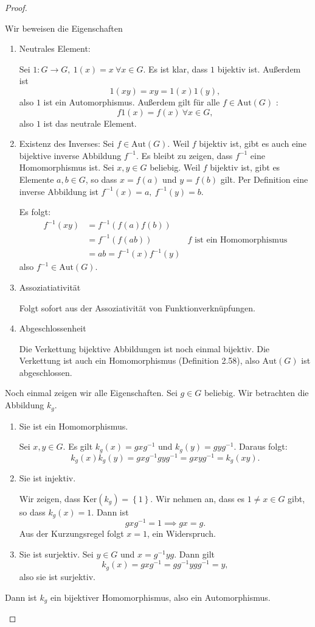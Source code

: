 \begin{proof}
	\begin{parts}
	\item Wir beweisen die Eigenschaften
		\begin{enumerate}[label=(\roman*)]
			\item Neutrales Element:

				Sei $1:G\to G,~1(x)=x~\forall x\in G$. Es ist klar, dass $1$ bijektiv ist. Außerdem ist
				\[
				1(xy)=xy=1(x)1(y)
			,\]
			also $1$ ist ein Automorphismus. Außerdem gilt f\"{u}r alle $f\in \text{Aut}(G)$ :
			 \[
			f 1(x)=f(x)~\forall x\in G
		,\]
		also $1$ ist das neutrale Element.
	\item Existenz des Inverses: Sei $f\in\text{Aut}(G)$. Weil $f$ bijektiv ist, gibt es auch eine bijektive inverse Abbildung $f^{-1}$. Es bleibt zu zeigen, dass $f^{-1}$ eine Homomorphismus ist. Sei $x,y\in G$ beliebig. Weil $f$ bijektiv ist, gibt es Elemente $a,b\in G$, so dass $x=f(a)$ und $y=f(b)$ gilt. Per Definition eine inverse Abbildung ist $f^{-1}(x)=a,~f^{-1}(y)=b$.

		Es folgt:
		\begin{align*}
			f^{-1}(xy)&=f^{-1}(f(a)f(b))\\
				  &=f^{-1}(f(ab)) & f\text{ ist ein Homomorphismus}\\
				  &=ab=f^{-1}(x)f^{-1}(y)
		\end{align*}
		also $f^{-1}\in \text{Aut}(G)$.
	\item Assoziatiativität

		Folgt sofort aus der Assoziativität von Funktionverknüpfungen.
	\item Abgeschlossenheit

		Die Verkettung bijektive Abbildungen ist noch einmal bijektiv. Die Verkettung ist auch ein Homomorphismus (Definition 2.58), also $\text{Aut}(G)$ ist abgeschlossen.
		\end{enumerate}
	\item Noch einmal zeigen wir alle Eigenschaften. Sei $g\in G$ beliebig. Wir betrachten die Abbildung $k_g$.
		\begin{enumerate}[label=(\roman*)]
			\item Sie ist ein Homomorphismus.

				Sei $x,y\in G$. Es gilt $k_g(x)=gxg^{-1}$ und $k_g(y)=gyg^{-1}$. Daraus folgt:
				\[
					k_g(x)k_g(y)=gxg^{-1}gyg^{-1}=gxyg^{-1}=k_g(xy)
				.\] 
			\item Sie ist injektiv.

				Wir zeigen, dass $\text{Ker}(k_g)=\left\{ 1 \right\} $. Wir nehmen an, dass es $1\neq x\in G$ gibt, so dass $k_g(x)=1$. Dann ist
				\[
					gxg^{-1}=1\implies gx=g
				.\] 
				Aus der Kurzungsregel folgt $x=1$, ein Widerspruch.
			\item Sie ist surjektiv. 
				Sei $y\in G$ und $x=g^{-1}yg$. Dann gilt
				\[
					k_g(x)=gxg^{-1}=gg^{-1}ygg^{-1}=y
				,\]
				also sie ist surjektiv.
		\end{enumerate}
		Dann ist $k_g$ ein bijektiver Homomorphismus, also ein Automorphismus.\qedhere
	\end{parts}
\end{proof}
